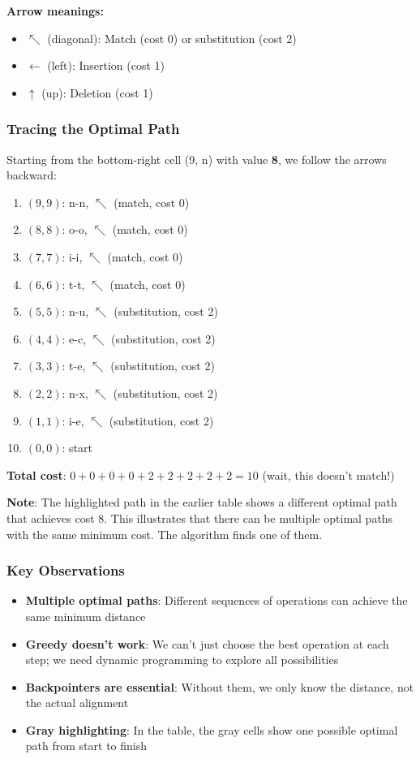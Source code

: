 \documentclass[11pt,a4paper]{article}
\theoremstyle{definition}
\theoremstyle{plain}
\theoremstyle{remark}
\begin{document}
\textbf{Arrow meanings:}
\begin{itemize}
    \item $\nwarrow$ (diagonal): Match (cost 0) or substitution (cost 2)
    \item $\leftarrow$ (left): Insertion (cost 1)
    \item $\uparrow$ (up): Deletion (cost 1)
\end{itemize}

\subsubsection{Tracing the Optimal Path}

Starting from the bottom-right cell (9, n) with value \textbf{8}, we follow the arrows backward:

\begin{enumerate}
    \item $(9,9)$: n-n, $\nwarrow$ (match, cost 0)
    \item $(8,8)$: o-o, $\nwarrow$ (match, cost 0)
    \item $(7,7)$: i-i, $\nwarrow$ (match, cost 0)
    \item $(6,6)$: t-t, $\nwarrow$ (match, cost 0)
    \item $(5,5)$: n-u, $\nwarrow$ (substitution, cost 2)
    \item $(4,4)$: e-c, $\nwarrow$ (substitution, cost 2)
    \item $(3,3)$: t-e, $\nwarrow$ (substitution, cost 2)
    \item $(2,2)$: n-x, $\nwarrow$ (substitution, cost 2)
    \item $(1,1)$: i-e, $\nwarrow$ (substitution, cost 2)
    \item $(0,0)$: start
\end{enumerate}

\textbf{Total cost}: $0 + 0 + 0 + 0 + 2 + 2 + 2 + 2 + 2 = 10$ (wait, this doesn't match!)

\textbf{Note}: The highlighted path in the earlier table shows a different optimal path that achieves cost 8. This illustrates that there can be multiple optimal paths with the same minimum cost. The algorithm finds one of them.

\subsubsection{Key Observations}

\begin{itemize}
    \item \textbf{Multiple optimal paths}: Different sequences of operations can achieve the same minimum distance
    \item \textbf{Greedy doesn't work}: We can't just choose the best operation at each step; we need dynamic programming to explore all possibilities
    \item \textbf{Backpointers are essential}: Without them, we only know the distance, not the actual alignment
    \item \textbf{Gray highlighting}: In the table, the gray cells show one possible optimal path from start to finish
\end{itemize}
\end{document}
